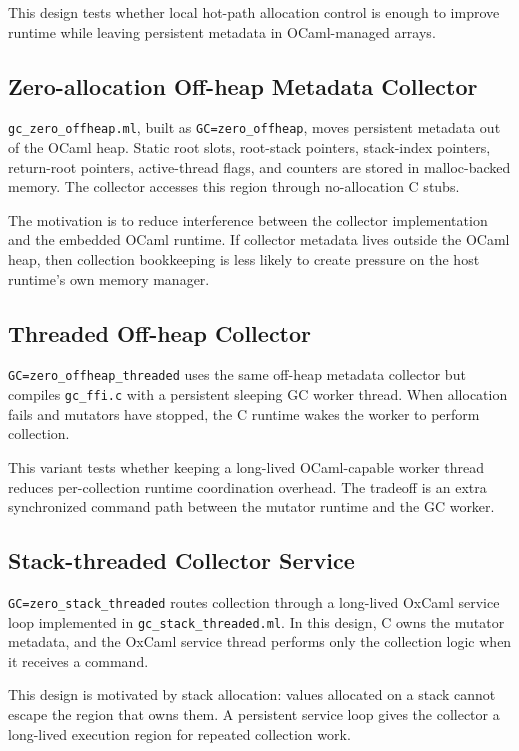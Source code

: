 \documentclass[11pt]{article}
\begin{document}
This design tests whether local hot-path allocation control is enough to improve
runtime while leaving persistent metadata in OCaml-managed arrays.

\subsection{Zero-allocation Off-heap Metadata Collector}

\texttt{gc\_zero\_offheap.ml}, built as \texttt{GC=zero\_offheap}, moves
persistent metadata out of the OCaml heap. Static root slots, root-stack
pointers, stack-index pointers, return-root pointers, active-thread flags, and
counters are stored in malloc-backed memory. The collector accesses this region
through no-allocation C stubs.

The motivation is to reduce interference between the collector implementation
and the embedded OCaml runtime. If collector metadata lives outside the OCaml
heap, then collection bookkeeping is less likely to create pressure on the host
runtime's own memory manager.

\subsection{Threaded Off-heap Collector}

\texttt{GC=zero\_offheap\_threaded} uses the same off-heap metadata collector
but compiles \texttt{gc\_ffi.c} with a persistent sleeping GC worker thread.
When allocation fails and mutators have stopped, the C runtime wakes the worker
to perform collection.

This variant tests whether keeping a long-lived OCaml-capable worker thread
reduces per-collection runtime coordination overhead. The tradeoff is an extra
synchronized command path between the mutator runtime and the GC worker.

\subsection{Stack-threaded Collector Service}

\texttt{GC=zero\_stack\_threaded} routes collection through a long-lived OxCaml
service loop implemented in \texttt{gc\_stack\_threaded.ml}. In this design, C
owns the mutator metadata, and the OxCaml service thread performs only the
collection logic when it receives a command.

This design is motivated by stack allocation: values allocated on a stack cannot
escape the region that owns them. A persistent service loop gives the collector
a long-lived execution region for repeated collection work.
\end{document}
